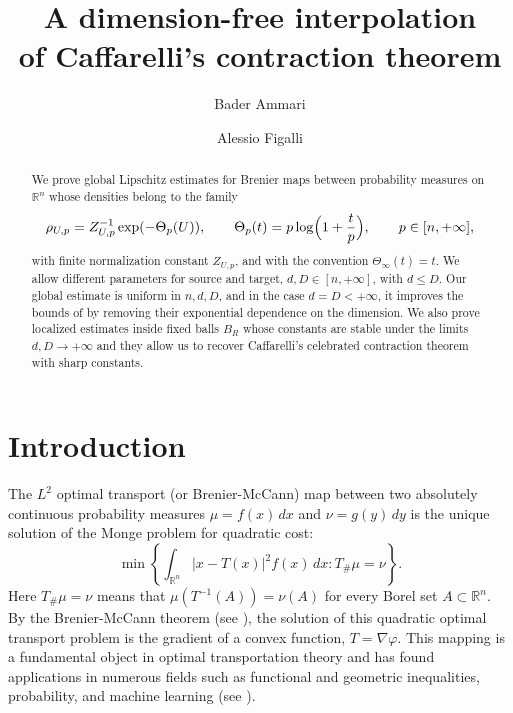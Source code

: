 \documentclass[11pt,a4paper,reqno]{amsart}
\title[]{A dimension-free interpolation\\ of Caffarelli’s contraction theorem}
\author[B. Ammari]{Bader Ammari}
\author[A. Figalli]{Alessio Figalli}
\numberwithin{equation}{section}
\theoremstyle{definition}
\newcommand{\<}{\ensuremath \leq}
\renewcommand{\>}{\ensuremath \geq}
\newcommand{\ThetaPar}{\Theta}
\newcommand{\Znorm}[2]{Z_{#1,#2}}
\begin{document}
\begin{abstract}
We prove global Lipschitz estimates for Brenier maps between probability measures on $\mathbb{R}^n$ whose densities belong to the family
\[
    \rho_{U,p}=\Znorm{U}{p}^{-1}\exp(-\ThetaPar_p(U)), \qquad
    \ThetaPar_p(t)=p\log\Bigl(1+\frac{t}{p}\Bigr),
    \qquad p\in[n,+\infty],
\]
with finite normalization constant $\Znorm{U}{p}$, and with the convention $\ThetaPar_{\infty}(t)=t$. 
We allow different parameters for source and target, $d,D\in[n,+\infty]$, with $d\le D$. Our global estimate is uniform in $n,d,D$,  and in the case $d=D<+\infty$, it improves the bounds of \cite{Alessio_Carlier_Santa} by removing their exponential dependence on the dimension. We also prove localized estimates inside fixed balls $B_R$ whose constants are stable under the limits $d,D\to+\infty$ and they allow us to recover Caffarelli's celebrated contraction theorem with sharp constants. 
\end{abstract}

\maketitle

\vspace{0.2cm}
{\small
{} }

\vspace{0.2cm}
{\small
{}}
\vspace{0.5cm}

\section{Introduction}

The $L^2$ optimal transport (or Brenier-McCann) map between two absolutely continuous probability measures $\mu=f(x)\, dx$ and $\nu=g(y)\, dy$ is the unique solution of the Monge problem for quadratic cost:
\[
    \min\left\{ \int_{\mathbb{R}^n}|x-T(x)|^2 f(x)\, dx : T_{\#}\mu=\nu \right\}.
\]
Here $T_{\#}\mu=\nu$ means that $\mu(T^{-1}(A))=\nu(A)$ for every Borel set $A\subset\mathbb{R}^n$.
By the Brenier-McCann theorem (see \cite{Brenier,McCann}), the solution of this quadratic optimal transport problem is the gradient of a convex function, $T=\nabla\varphi$. This mapping is a fundamental object in optimal transportation theory and has found applications in numerous fields such as functional and geometric inequalities, probability, and machine learning (see \cite{Figalli_Maggi_Pratelli,Ambrosio_Stra,Benamou_Carlier}).
\end{document}
